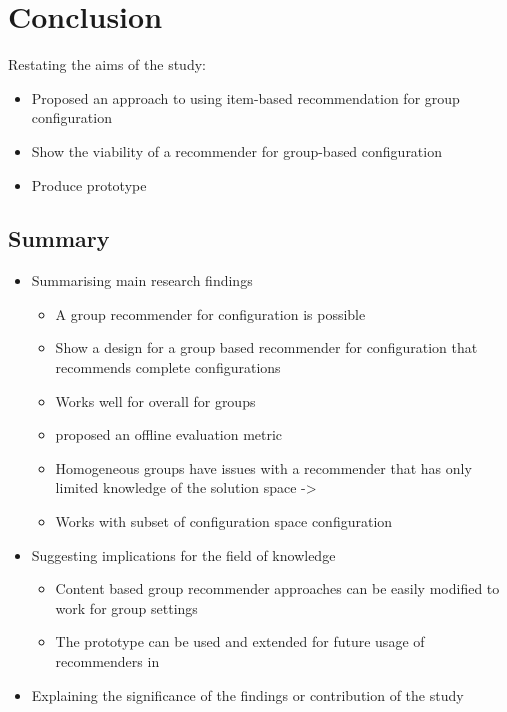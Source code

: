 \chapter{Conclusion}
\label{ch:Conclusion}


Restating the aims of the study:
\begin{itemize}
    \item Proposed an approach to using item-based recommendation for group configuration
    \item Show the viability of a recommender for group-based configuration
    \item Produce prototype
\end{itemize}

\section{Summary}
\label{sec:Conclusion:Summary}

\begin{itemize}
    \item Summarising main research findings
        \begin{itemize}
            \item A group recommender for configuration is possible
            \item Show a design for a group based recommender for configuration that recommends complete configurations
            \item Works well for overall for groups
            \item proposed an offline evaluation metric
            \item Homogeneous groups have issues with a recommender that has only limited knowledge of the solution space -> 
            \item Works with subset of configuration space configuration
        \end{itemize}
    \item Suggesting implications for the field of knowledge
        \begin{itemize}
            \item Content based group  recommender approaches can be easily modified to work for group settings
            \item The prototype can be used and extended for future usage of recommenders in  
        \end{itemize}
    \item Explaining the significance of the findings or contribution of the study
\end{itemize}

